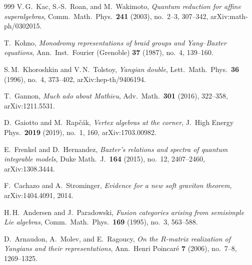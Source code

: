 \documentclass[11pt]{memoir}
\begin{document}
\begin{thebibliography}{999}
V.\,G.~Kac, S.-S.~Roan, and M.~Wakimoto, \emph{Quantum reduction for affine superalgebras}, Comm.\ Math.\ Phys.\ \textbf{241} (2003), no.~2--3, 307--342, arXiv:math-ph/0302015.

T.~Kohno, \emph{Monodromy representations of braid groups and Yang--Baxter equations}, Ann.\ Inst.\ Fourier (Grenoble) \textbf{37} (1987), no.~4, 139--160.

S.\,M.~Khoroshkin and V.\,N.~Tolstoy, \emph{Yangian double}, Lett.\ Math.\ Phys.\ \textbf{36} (1996), no.~4, 373--402, arXiv:hep-th/9406194.

T.~Gannon, \emph{Much ado about Mathieu}, Adv.\ Math.\ \textbf{301} (2016), 322--358, arXiv:1211.5531.

D.~Gaiotto and M.~Rap\v{c}\'ak, \emph{Vertex algebras at the corner}, J.\ High Energy Phys.\ \textbf{2019} (2019), no.~1, 160, arXiv:1703.00982.

E.~Frenkel and D.~Hernandez, \emph{Baxter's relations and spectra of quantum integrable models}, Duke Math.\ J.\ \textbf{164} (2015), no.~12, 2407--2460, arXiv:1308.3444.

F.~Cachazo and A.~Strominger, \emph{Evidence for a new soft graviton theorem}, arXiv:1404.4091, 2014.

H.\,H.~Andersen and J.~Paradowski, \emph{Fusion categories arising from semisimple Lie algebras}, Comm.\ Math.\ Phys.\ \textbf{169} (1995), no.~3, 563--588.



D.~Arnaudon, A.~Molev, and E.~Ragoucy, \emph{On the $R$-matrix realization of Yangians and their representations}, Ann.\ Henri Poincar\'e \textbf{7} (2006), no.~7--8, 1269--1325.


\end{thebibliography}
\end{document}
